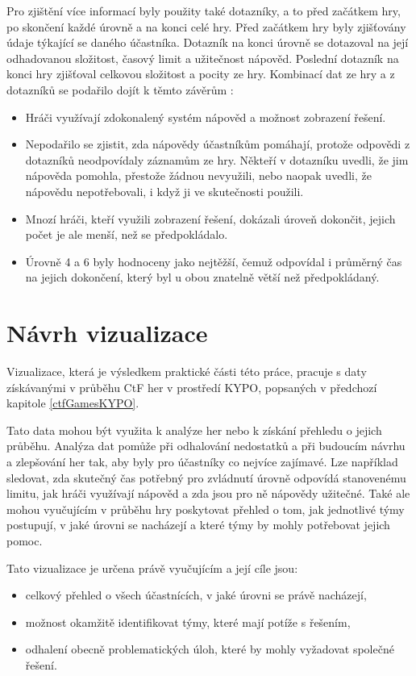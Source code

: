 \documentclass[
  digital, %
  oneside, %
  table,   %
  nolof,     %
  nolot,     %
]{fithesis3}
\begin{document}
Pro zjištění více informací byly použity také dotazníky, a to před začátkem hry, po skončení každé úrovně a na konci celé hry. Před začátkem hry byly zjišťovány údaje týkající se daného účastníka. Dotazník na konci úrovně se dotazoval na její odhadovanou složitost, časový limit a užitečnost nápověd. Poslední dotazník na konci hry zjišťoval celkovou složitost a pocity ze hry. Kombinací dat ze hry a z dotazníků se podařilo dojít k těmto závěrům \cite{ctfDesign}:
\begin{itemize}
  \item Hráči využívají zdokonalený systém nápověd a možnost zobrazení řešení.
  \item Nepodařilo se zjistit, zda nápovědy účastníkům pomáhají, protože odpovědi z dotazníků neodpovídaly záznamům ze hry. Někteří v dotazníku uvedli, že jim nápověda pomohla, přestože žádnou nevyužili, nebo naopak uvedli, že nápovědu nepotřebovali, i když ji ve skutečnosti použili.
  \item Mnozí hráči, kteří využili zobrazení řešení, dokázali úroveň dokončit, jejich počet je ale menší, než se předpokládalo.
  \item Úrovně 4 a 6 byly hodnoceny jako nejtěžší, čemuž odpovídal i průměrný čas na jejich dokončení, který byl u obou znatelně větší než předpokládaný.
\end{itemize}

\chapter{Návrh vizualizace}
Vizualizace, která je výsledkem praktické části této práce, pracuje s daty získávanými v průběhu CtF her v prostředí KYPO, popsaných v předchozí kapitole \ref{ctfGamesKYPO}.\par
Tato data mohou být využita k analýze her nebo k získání přehledu o jejich průběhu. Analýza dat pomůže při odhalování nedostatků a při budoucím návrhu a zlepšování her tak, aby byly pro účastníky co nejvíce zajímavé. Lze například sledovat, zda skutečný čas potřebný pro zvládnutí úrovně odpovídá stanovenému limitu, jak hráči využívají nápověd a zda jsou pro ně nápovědy užitečné. Také ale mohou vyučujícím v průběhu hry poskytovat přehled o tom, jak jednotlivé týmy postupují, v jaké úrovni se nacházejí a které týmy by mohly potřebovat jejich pomoc.\par
Tato vizualizace je určena právě vyučujícím a její cíle jsou:
\begin{itemize}
  \item celkový přehled o všech účastnících, v jaké úrovni se právě nacházejí,
  \item možnost okamžitě identifikovat týmy, které mají potíže s řešením,
  \item odhalení obecně problematických úloh, které by mohly vyžadovat společné řešení.
\end{itemize}
\end{document}
